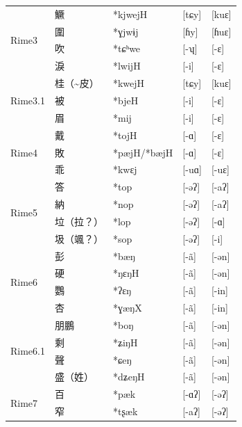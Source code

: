 \documentclass{scrbook}
\newcounter{c}[subsubsection]
\newcommand{\bolang}{\textasciitilde}
\begin{document}
\begin{sloppypar}
\begin{landscape}
\begin{longtable}[htbp]{lllll}
    \midrule
    \multirow{4}[2]{*}{Rime3} & 鱖     & *kjwejH & [tɕy] & [kuɛ] \\
          & 圍     & *ɣjwɨj & [ɦy]  & [ɦuɛ] \\
          & 吹     & *tɕʰwe & [-ʮ]  & [-ɛ] \\
          & 淚     & *lwijH & [-i]  & [-ɛ] \\
    \midrule
    \multirow{3}[2]{*}{Rime3.1} & 桂（\bolang 皮） & *kwejH & [tɕy] & [kuɛ] \\
          & 被     & *bjeH & [-i]  & [-ɛ] \\
          & 眉     & *mij  & [-i]  & [-ɛ] \\
    \midrule
    \multirow{3}[2]{*}{Rime4} & 戴     & *tojH & [-ɑ]  & [-ɛ] \\
          & 敗     & *pæjH/*bæjH & [-ɑ]  & [-ɛ] \\
          & 乖     & *kwɛj & [-uɑ] & [-uɛ] \\
    \midrule
    \multirow{4}[2]{*}{Rime5} & 答     & *top  & [-əʔ] & [-aʔ] \\
          & 納     & *nop  & [-əʔ] & [-aʔ] \\
          & 垃（拉？） & *lop  & [-əʔ] & [-ɑ] \\
          & 圾（颯？） & *sop  & [-əʔ] & [-i] \\
    \midrule
    \multirow{4}[2]{*}{Rime6} & 彭     & *bæŋ  & [-ã] & [-ən] \\
          & 硬     & *ŋɛŋH & [-ã] & [-ən] \\
          & 鸚     & *ʔɛŋ  & [-ã] & [-in] \\
          & 杏     & *ɣæŋX & [-ã] & [-in] \\
    \midrule
    \multirow{4}[2]{*}{Rime6.1} & 朋鵬    & *boŋ  & [-ã] & [-ən] \\
          & 剩     & *ʑiŋH & [-ã] & [-ən] \\
          & 聲     & *ɕeŋ  & [-ã] & [-ən] \\
          & 盛（姓）  & *dʑeŋH & [-ã] & [-ən] \\
    \midrule
    \multirow{3}[2]{*}{Rime7} & 百     & *pæk  & [-ɑʔ] & [-əʔ] \\
          & 窄     & *tʂæk & [-aʔ] & [-əʔ] \\

\end{longtable}
\end{landscape}
\end{sloppypar}
\end{document}
